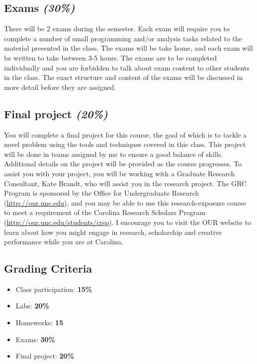 \documentclass[11pt,]{article}
\providecommand{\tightlist}{%
  \setlength{\itemsep}{0pt}\setlength{\parskip}{0pt}}
\begin{document}
\hypertarget{exams-30}{%
\subsection{\texorpdfstring{Exams
\emph{(30\%)}}{Exams (30\%)}}\label{exams-30}}

There will be 2 exams during the semester. Each exam will require you to
complete a number of small programming and/or analysis tasks related to
the material presented in the class. The exams will be take home, and
each exam will be written to take between 3-5 hours. The exams are to be
completed individually and you are forbidden to talk about exam content
to other students in the class. The exact structure and content of the
exams will be discussed in more detail before they are assigned.

\hypertarget{final-project-20}{%
\subsection{\texorpdfstring{Final project
\emph{(20\%)}}{Final project (20\%)}}\label{final-project-20}}

You will complete a final project for this course, the goal of which is
to tackle a novel problem using the tools and techniques covered in this
class. This project will be done in teams assigned by me to ensure a
good balance of skills. Additional details on the project will be
provided as the course progresses. To assist you with your project, you
will be working with a Graduate Research Consultant, Kate Brandt, who
will assist you in the research project. The GRC Program is sponsored by
the Office for Undergraduate Research (\url{http://our.unc.edu}), and
you may be able to use this research-exposure course to meet a
requirement of the Carolina Research Scholars Program
(\url{http://our.unc.edu/students/crsp}). I encourage you to visit the
OUR website to learn about how you might engage in research, scholarship
and creative performance while you are at Carolina.

\hypertarget{grading-criteria}{%
\subsection{Grading Criteria}\label{grading-criteria}}

\begin{itemize}
\tightlist
\item
  Class participation: \textbf{15\%}
\item
  Labs: \textbf{20\%}
\item
  Homeworks: \textbf{15}
\item
  Exams: \textbf{30\%}
\item
  Final project: \textbf{20\%}
\end{itemize}
\end{document}
